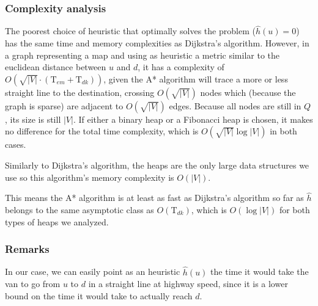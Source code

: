 \subsubsection{Complexity analysis}
The poorest choice of heuristic that optimally solves the problem ($\hat{h}(u)=0$) has the same time and memory complexities as Dijkstra's algorithm. However, in a graph representing a map and using as heuristic a metric similar to the euclidean distance between $u$ and $d$, it has a complexity of $O(\sqrt{|V|} \cdot (\text{T}_{em}+\text{T}_{dk}))$, given the A* algorithm will trace a more or less straight line to the destination, crossing $O(\sqrt{|V|})$ nodes which (because the graph is sparse) are adjacent to $O(\sqrt{|V|})$ edges. Because all nodes are still in $Q$, its size is still $|V|$. If either a binary heap or a Fibonacci heap is chosen, it makes no difference for the total time complexity, which is $O(\sqrt{|V|} \log |V|)$ in both cases.\par
Similarly to Dijkstra's algorithm, the heaps are the only large data structures we use so this algorithm's memory complexity is $O(|V|)$.\par
This means the A* algorithm is at least as fast as Dijkstra's algorithm so far as $\hat{h}$ belongs to the same asymptotic class as $O(\text{T}_{dk})$, which is $O(\log |V|)$ for both types of heaps we analyzed.
\subsubsection{Remarks}
In our case, we can easily point as an heuristic $\hat{h}(u)$ the time it would take the van to go from $u$ to $d$ in a straight line at highway speed, since it is a lower bound on the time it would take to actually reach $d$.
